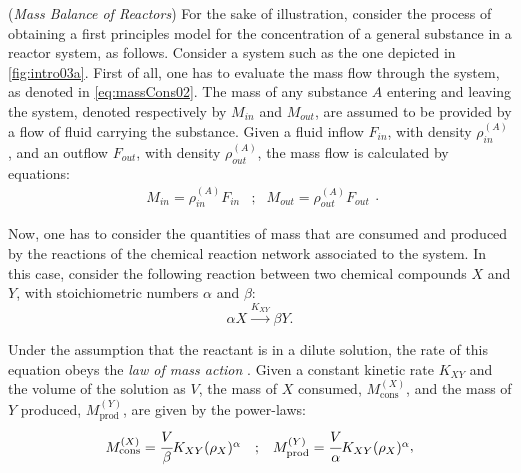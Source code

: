 \documentclass[a4paper,11pt]{book}
\numberwithin{figure}{chapter}
\numberwithin{equation}{chapter}
\numberwithin{table}{chapter}
\theoremstyle{definition}
\newtheorem{example}{Example}[chapter]
\newcounter{boxed-theorem}
\newcounter{boxed-lemma}
\newcounter{boxed-definition}
\newcounter{boxed-example}
\newenvironment{boxed-example}[1]
{\colorlet{shadecolor}{pastelRed!15} \begin{shaded} \begin{example}{#1}}
{\end{example} \end{shaded}}
\begin{document}
\begin{boxed-example}{(\textit{Mass Balance of Reactors})} \label{ex:isoReactSys01}
    For the sake of illustration, consider the process of obtaining a first principles model for the concentration of a general substance in a reactor system, as follows. Consider a system such as the one depicted in \ref{fig:intro03a}. First of all, one has to evaluate the mass flow through the system, as denoted in \eqref{eq:massCons02}. The mass of any substance $A$ entering and leaving the system, denoted respectively by $M_{in}$ and $M_{out}$, are assumed to be provided by a flow of fluid carrying the substance. Given a fluid inflow $F_{in}$, with density $\rho^{(A)}_{in}$, and an outflow $F_{out}$, with density $\rho^{(A)}_{out}$, the mass flow is calculated by equations:
    \begin{equation}
        \begin{matrix}
            M_{in} = \rho^{(A)}_{in} F_{in} &; & M_{out} = \rho^{(A)}_{out} F_{out}
        \end{matrix}
    .\end{equation}
    
    Now, one has to consider the quantities of mass that are consumed and produced by the reactions of the chemical reaction network associated to the system. In this case, consider the following reaction between two chemical compounds $X$ and $Y$, with stoichiometric numbers $\alpha$ and $\beta$:
    \begin{equation} \label{eq:simpleEq01}
        \alpha X \overset{K_{XY}}{\longrightarrow} \beta Y
    .\end{equation}
    
    Under the assumption that the reactant is in a dilute solution, the rate of this equation obeys the \textit{law of mass action} \cite{Horn:1972}. Given a constant kinetic rate $K_{XY}$ and the volume of the solution as $V$, the mass of $X$ consumed, $M^{(X)}_\text{cons}$, and the mass of $Y$ produced, $M^{(Y)}_\text{prod}$, are given by the power-laws:
    \begin{equation}
        \begin{matrix}
            M^{(X)}_\text{cons} = \cfrac{V}{\beta} K_{XY} (\rho_X)^{\alpha} &; & M^{(Y)}_\text{prod} = \cfrac{V}{\alpha} K_{XY} (\rho_X)^{\alpha}
        \end{matrix}
    ,\end{equation}
    

\end{boxed-example}
\end{document}
